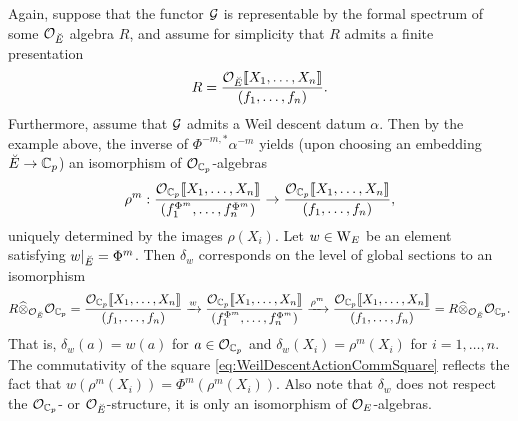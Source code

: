 \documentclass[../main.tex]{subfiles}
\begin{document}
\begin{xpl}
  Again, suppose that the functor 
  $\mathcal{G}$ is representable by the formal spectrum of some $\mathcal{O}_{{\breve {E}}}$ algebra $R$,
  and assume for simplicity that $R$ admits a finite presentation
  \begin{equation*}
    R = \frac{\mathcal{O}_{\breve {E}} \llbracket X_1, \dots, X_n\rrbracket}{(f_1, \dots, f_n)}.
  \end{equation*}
  Furthermore, assume that $\mathcal{G}$ admits a Weil descent datum $\alpha$. 
  Then by the example above, the inverse of $\Phi^{-m, *} \alpha^{-m}$
  yields (upon choosing an embedding ${\breve {E}} \to \mathbb{C}_p$) an isomorphism of
  $\mathcal{O}_{\mathbb{C}_p}$-algebras
  \begin{equation*}
    \rho^m: \frac{\mathcal{O}_{\mathbb{C}_p} \llbracket X_1, \dots, X_n\rrbracket}{(f_1^{\Phi^m},
    \dots, f_n^{\Phi^m})} \to 
    \frac{\mathcal{O}_{\mathbb{C}_p} \llbracket X_1, \dots, X_n\rrbracket}{(f_1, \dots, f_n)},
  \end{equation*}
  uniquely determined by the images $\rho(X_i)$. 
  Let $w \in \mathrm W_E$ be an element satisfying $w|_{{\breve {E}}} = \Phi^{m}$.
  Then $\delta_w$ corresponds on the level of global sections to an isomorphism
  \begin{equation*}
    R \widehat \otimes_{\mathcal{O}_{\breve {E}}} \mathcal{O}_{\mathbb{C}_p} = \frac{\mathcal{O}_{\mathbb{C}_p} \llbracket X_1, \dots,
    X_n\rrbracket}{(f_1,
      \dots, f_n)} \xrightarrow{w}  \frac{\mathcal{O}_{\mathbb{C}_p} \llbracket X_1, \dots,
        X_n\rrbracket}{(f_1^{\Phi^m}, \dots, f_n^{\Phi^m})} \xrightarrow{\rho^m}
        \frac{\mathcal{O}_{\mathbb{C}_p} \llbracket X_1, \dots, X_n\rrbracket}{(f_1, \dots, f_n)} = R
        \widehat \otimes_{\mathcal{O}_{\breve {E}}} {\mathcal{O}_{\mathbb{C}_p}}.
  \end{equation*}
  That is, $\delta_w(a) = w(a)$ for $a \in \mathcal{O}_{\mathbb{C}_p}$ and $\delta_w(X_i) =
  \rho^m(X_i)$ for $i= 1, \dots, n$. The commutativity of the square
  \eqref{eq:WeilDescentActionCommSquare}
  reflects the fact that $w(\rho^m(X_i)) = \Phi^{m}(\rho^m(X_i))$. Also note that 
  $\delta_w$ does not respect the $\mathcal{O}_{\mathbb{C}_p}$- or 
  $\mathcal{O}_{{\breve {E}}}$-structure, it is only an isomorphism of $\mathcal{O}_E$-algebras.
\end{xpl}
\end{document}
